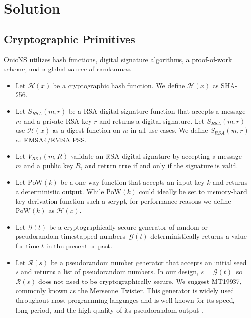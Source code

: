 \documentclass[USenglish,oneside,twocolumn]{article}
\begin{document}
\section{Solution}
\label{sec:Solution}

\subsection{Cryptographic Primitives}
\label{sec:cryptoPrimitives}

OnioNS utilizes hash functions, digital signature algorithms, a proof-of-work scheme, and a global source of randomness.

\begin{itemize}
	\item Let $ \mathcal{H}(x) $ be a cryptographic hash function. We define $ \mathcal{H}(x) $ as SHA-256.
	\item Let $ S_{\mathit{RSA}}(m, r) $ be a RSA digital signature function that accepts a message $ m $ and a private RSA key $ r $ and returns a digital signature. Let $ S_{\mathit{RSA}}(m, r) $ use $ \mathcal{H}(x) $ as a digest function on $ m $ in all use cases. We define $ S_{\mathit{RSA}}(m, r) $ as EMSA4/EMSA-PSS.
	\item Let $ V_{\mathit{RSA}}(m, R) $ validate an RSA digital signature by accepting a message $ m $ and a public key $ R $, and return true if and only if the signature is valid.
	\item Let $ \mathrm{PoW}(k) $ be a one-way function that accepts an input key $ k $ and returns a deterministic output. While $ \mathrm{PoW}(k) $ could ideally be set to memory-hard key derivation function such a scrypt, \cite{percival2012scrypt} for performance reasons we define $ \mathrm{PoW}(k) $ as $ \mathcal{H}(x) $.
	\item Let $ \mathcal{G}(t) $ be a cryptographically-secure generator of random or pseudorandom timestapped numbers. $ \mathcal{G}(t) $ deterministically returns a value for time $ t $ in the present or past.
	\item Let $ \mathcal{R}(s) $ be a pseudorandom number generator that accepts an initial seed $ s $ and returns a list of pseudorandom numbers. In our design, $ s = \mathcal{G}(t) $, so $ \mathcal{R}(s) $ does not need to be cryptographically secure. We suggest MT19937, commonly known as the Mersenne Twister. This generator is widely used throughout most programming languages and is well known for its speed, long period, and the high quality of its pseudorandom output \cite{matsumoto1998mersenne}.
\end{itemize}
\end{document}
